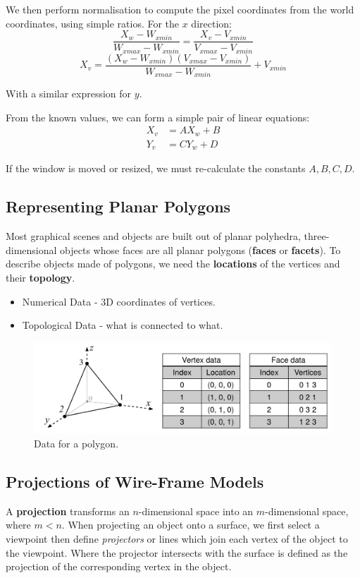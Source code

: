 \documentclass[11pt]{article}
\begin{document}
We then perform normalisation to compute the pixel coordinates from the world coordinates, using simple ratios.
For the $x$ direction:
\[
  \frac{X_w - W_{xmin}}{W_{xmax} - W_{xmin}} = \frac{X_v - V_{xmin}}{V_{xmax} - V_{xmin}}
\]
\[
  X_v = \frac{(X_w - W_{xmin})(V_{xmax} - V_{xmin})}{W_{xmax} - W_{xmin}} + V_{xmin}
\]

With a similar expression for $y$.

From the known values, we can form a simple pair of linear equations:
\begin{align*}
  X_v &= AX_w + B \\
  Y_v &= CY_w + D
\end{align*}

If the window is moved or resized, we must re-calculate the constants $A, B, C, D$.

\subsection{Representing Planar Polygons}
Most graphical scenes and objects are built out of planar polyhedra, three-dimensional objects whose faces are all planar polygons (\textbf{faces} or \textbf{facets}).
To describe objects made of polygons, we need the \textbf{locations} of the vertices and their \textbf{topology}.

\begin{itemize}
  \item Numerical Data - 3D coordinates of vertices.
  \item Topological Data - what is connected to what.
\end{itemize}

\begin{figure}[h]
  \caption{Data for a polygon.}
  \includegraphics[scale=0.3]{polygon}
  \centering
\end{figure}

\subsection{Projections of Wire-Frame Models}
A \textbf{projection} transforms an $n$-dimensional space into an $m$-dimensional space, where $m < n$.
When projecting an object onto a surface, we first select a viewpoint then define \textit{projectors} or lines which join each vertex of the object to the viewpoint.
Where the projector intersects with the surface is defined as the projection of the corresponding vertex in the object.
\end{document}
